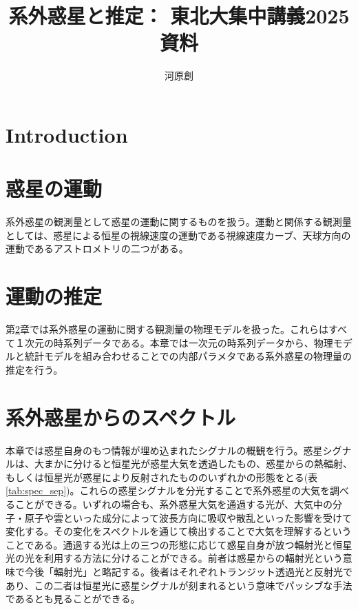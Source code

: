 \documentclass[xelatex,a4paper, twocolumn]{bxjsreport}
\begin{document}
\title{系外惑星と推定： 東北大集中講義2025資料}
\author{河原創}
\maketitle

\tableofcontents

\chapter{Introduction}




\chapter{惑星の運動}\label{ch:motion}
系外惑星の観測量として惑星の運動に関するものを扱う。運動と関係する観測量としては、惑星による恒星の視線速度の運動である視線速度カーブ、天球方向の運動であるアストロメトリの二つがある。




\chapter{運動の推定}\label{ch:infer}

第\ref{ch:motion}章では系外惑星の運動に関する観測量の物理モデルを扱った。これらはすべて１次元の時系列データである。本章では一次元の時系列データから、物理モデルと統計モデルを組み合わせることでの内部パラメタである系外惑星の物理量の推定を行う。




\chapter{系外惑星からのスペクトル}



本章では惑星自身のもつ情報が埋め込まれたシグナルの概観を行う。惑星シグナルは、大まかに分けると恒星光が惑星大気を透過したもの、惑星からの熱輻射、もしくは恒星光が惑星により反射されたもののいずれかの形態をとる(表\ref{tab:spec_sep})。これらの惑星シグナルを分光することで系外惑星の大気を調べることができる。いずれの場合も、系外惑星大気を通過する光が、大気中の分子・原子や雲といった成分によって波長方向に吸収や散乱といった影響を受けて変化する。その変化をスペクトルを通じて検出することで大気を理解するということである。通過する光は上の三つの形態に応じて惑星自身が放つ輻射光と恒星光の光を利用する方法に分けることができる。前者は惑星からの輻射光という意味で今後「輻射光」と略記する。後者はそれぞれトランジット透過光と反射光であり、この二者は恒星光に惑星シグナルが刻まれるという意味でパッシブな手法であるとも見ることができる。
\end{document}
